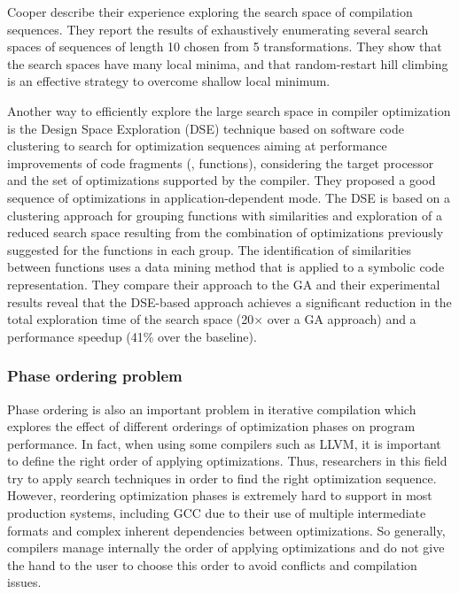 Cooper \etal\cite{cooper2006exploring} describe their experience exploring the search space of compilation sequences. They report the results of exhaustively enumerating several search spaces of sequences of length 10 chosen from 5 transformations. They show that the search spaces have many local minima, and that random-restart hill climbing is an effective strategy to overcome shallow local minimum.


Another way to efficiently explore the large search space in compiler optimization is the Design Space Exploration (DSE) technique based on software code clustering to search for optimization sequences aiming at performance improvements of code fragments (\eg, functions), considering the target processor and the set of optimizations supported by the compiler\cite{martins2014exploration,martins2016clustering}. They proposed a good sequence of optimizations in application-dependent mode. The DSE is based on a clustering approach for grouping functions with similarities
and exploration of a reduced search space resulting from the combination of optimizations previously suggested for the functions in each group.
The identification of similarities between functions uses a data mining method that is applied to a symbolic code representation.
They compare their approach to the GA and their experimental results reveal that the DSE-based approach achieves a significant reduction in the total exploration time of the search space (20× over a GA approach) and a performance speedup (41\% over the baseline). 




\subsubsection{Phase ordering problem}
Phase ordering is also an important problem in iterative compilation which explores the effect of different orderings of optimization phases on program performance. In fact, when using some compilers such as LLVM, it is important to define the right order of applying optimizations. Thus, researchers in this field try to apply search techniques in order to find the right optimization sequence. However, reordering optimization phases is extremely hard to support in most production systems, including GCC due to their use of multiple intermediate formats and complex inherent dependencies between optimizations. So generally, compilers manage internally the order of applying optimizations and do not give the hand to the user to choose this order to avoid conflicts and compilation issues.

